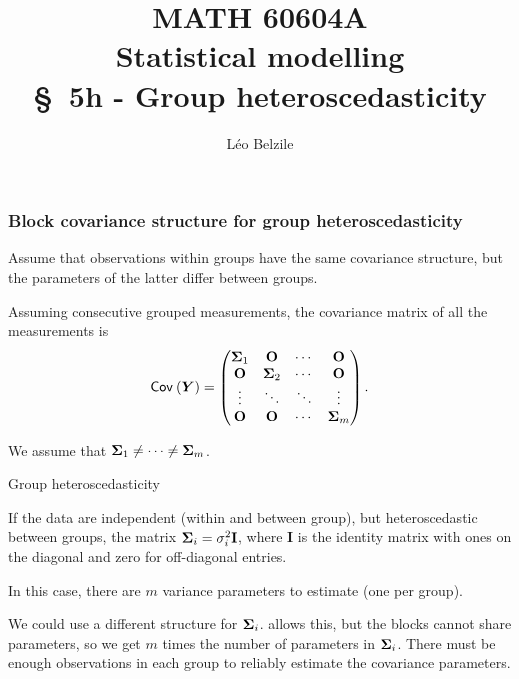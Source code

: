 \documentclass{beamer}
\title[\color{white}{MATH 60604A \S~5h - Group heteroscedasticity}]{\texorpdfstring{MATH 60604A \\Statistical modelling \\ \S~5h - Group heteroscedasticity}{MATH 60604A \\Statistical modelling \\ \S~5h - Group heteroscedasticity}}
\author{Léo Belzile}
\institute{HEC Montréal\\
Department of Decision Sciences}
\date{}
\begin{document}
\frame{\titlepage}


\begin{frame}
\frametitle{Block covariance structure for group heteroscedasticity}
\bi 
 \item Assume that observations within groups have the same covariance structure, but the parameters of the latter differ between groups.
 \item 
 Assuming consecutive grouped measurements, the covariance matrix of all the measurements is 
 \begin{align*}
  {\mathsf{Cov}_{}}\left(\boldsymbol {Y}\right) = \begin{pmatrix}
                 \boldsymbol {\Sigma}_1 & \mathbf{O} & \cdots & \mathbf{O}\\
                  \mathbf{O} &\boldsymbol {\Sigma}_2 & \cdots & \mathbf{O} \\
                  \vdots & \ddots & \ddots & \vdots \\
                   \mathbf{O} & \mathbf{O} & \cdots & \boldsymbol {\Sigma}_m 
                \end{pmatrix}.
\end{align*}
\item We assume that $\boldsymbol {\Sigma}_1 \neq \cdots \neq \boldsymbol {\Sigma}_m$.
\ei \end{frame}
\begin{frame}{Group heteroscedasticity}
\bi
\item If the data are independent (within and between group), but heteroscedastic between groups, the matrix $\boldsymbol {\Sigma}_i = \sigma_i^2\mathbf{I}$, where $\mathbf{I}$ is the identity matrix with ones on the diagonal and zero for off-diagonal entries.  
\item In this case, there are $m$ variance parameters to estimate (one per group).
 
\item We could use a different structure for $\boldsymbol {\Sigma}_i$. \SASlang{} allows this, but the blocks cannot share parameters, so we get $m$ times the number of parameters in $\boldsymbol {\Sigma}_i$. There must be enough observations in each group to reliably estimate the covariance parameters.
\ei
\end{frame}
\end{document}
